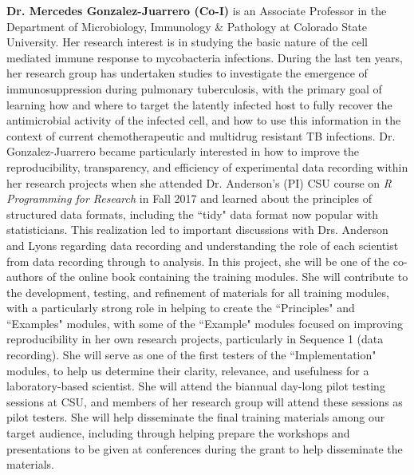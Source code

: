 \documentclass[pdftex,english,11pt,parskip=half]{scrartcl}
\begin{document}
\noindent \textbf{Dr. Mercedes Gonzalez-Juarrero (Co-I)} is an Associate Professor in the Department of Microbiology, Immunology \& Pathology at Colorado State University. Her research interest is in studying the basic nature of the cell mediated immune response to mycobacteria infections. During the last ten years, her research group has undertaken studies to investigate the emergence of immunosuppression during pulmonary tuberculosis, with the primary goal of learning how and where to target the latently infected host to fully recover the antimicrobial activity of the infected cell, and how to use this information in the context of current chemotherapeutic and multidrug resistant TB infections. Dr. Gonzalez-Juarrero became particularly interested in how to improve the reproducibility, transparency, and efficiency of experimental data recording within her research projects when she attended Dr. Anderson's (PI) CSU course on \textit{R Programming for Research} in Fall 2017 and learned about the principles of structured data formats, including the ``tidy" data format now popular with statisticians. This realization led to important discussions with Drs. Anderson and Lyons regarding data recording and understanding the role of each scientist from data recording through to analysis. In this project, she will be one of the co-authors of the online book containing the training modules. She will contribute to the development, testing, and refinement of materials for all training modules, with a particularly strong role in helping to create the ``Principles" and ``Examples" modules, with some of the ``Example" modules focused on improving reproducibility in her own research projects, particularly in Sequence 1 (data recording). She will serve as one of the first testers of the ``Implementation" modules, to help us determine their clarity, relevance, and usefulness for a laboratory-based scientist. She will attend the biannual day-long pilot testing sessions at CSU, and members of her research group will attend these sessions as pilot testers. She will help disseminate the final training materials among our target audience, including through helping prepare the workshops and presentations to be given at conferences during the grant to help disseminate the materials.
\end{document}
